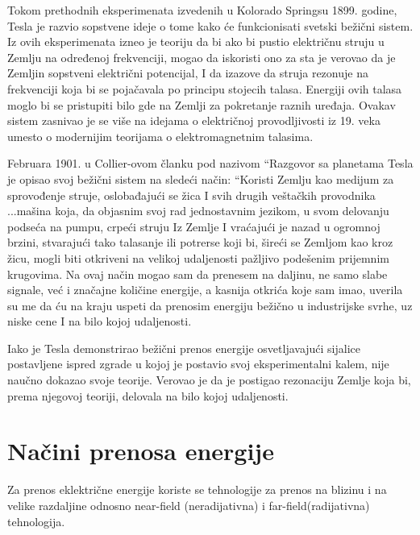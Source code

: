 \documentclass[a4paper]{article}
\begin{document}
Tokom prethodnih eksperimenata izvedenih u Kolorado Springsu 1899. godine, Tesla je razvio sopstvene ideje o tome kako će funkcionisati svetski bežični sistem. Iz ovih eksperimenata izneo je teoriju da bi ako bi pustio električnu struju u Zemlju na određenoj frekvenciji, mogao da iskoristi ono za sta je verovao da je Zemljin sopstveni električni potencijal, I da izazove da struja rezonuje na frekvenciji koja bi se pojačavala po principu stojecih talasa\cite{stojeciTalasi}. Energiji ovih talasa moglo bi se pristupiti bilo gde na Zemlji za pokretanje raznih uređaja. Ovakav sistem zasnivao je se više na idejama o električnoj provodljivosti iz 19. veka umesto o modernijim teorijama o elektromagnetnim talasima.
	
Februara 1901. u Collier-ovom članku pod nazivom “Razgovor sa planetama Tesla je opisao svoj bežični sistem na sledeći način:
“Koristi Zemlju kao medijum za sprovođenje struje, oslobađajući se žica I svih drugih veštačkih provodnika ...mašina koja, da objasnim svoj rad jednostavnim jezikom, u svom delovanju podseća na pumpu, crpeći struju Iz Zemlje I vraćajući je nazad u ogromnoj brzini, stvarajući tako talasanje ili potrerse koji bi, šireći se Zemljom kao kroz žicu, mogli biti otkriveni na velikoj udaljenosti pažljivo podešenim prijemnim krugovima. Na ovaj način mogao sam da prenesem na daljinu, ne samo slabe signale, već i značajne količine energije, a kasnija otkrića koje sam imao, uverila su me da ću na kraju uspeti da prenosim energiju bežično u industrijske svrhe, uz niske cene I na bilo kojoj udaljenosti.

Iako je Tesla demonstrirao bežični prenos energije osvetljavajući sijalice postavljene ispred zgrade u kojoj je postavio svoj eksperimentalni kalem,\cite{teslinClanak} nije naučno dokazao svoje teorije. Verovao je da je postigao rezonaciju Zemlje koja bi, prema njegovoj teoriji, delovala na bilo kojoj udaljenosti.\cite{teorija}


\section{Načini prenosa energije}

Za prenos eklektrične energije koriste se tehnologije za prenos na blizinu i na velike razdaljine odnosno near-field (neradijativna) i far-field(radijativna) tehnologija.
\end{document}
